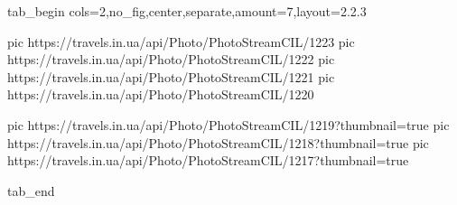  
 
 
 
 


\ifcmt
  tab_begin cols=2,no_fig,center,separate,amount=7,layout=2.2.3

     pic https://travels.in.ua/api/Photo/PhotoStreamCIL/1223
     pic https://travels.in.ua/api/Photo/PhotoStreamCIL/1222
		 pic https://travels.in.ua/api/Photo/PhotoStreamCIL/1221
		 pic https://travels.in.ua/api/Photo/PhotoStreamCIL/1220

		 pic https://travels.in.ua/api/Photo/PhotoStreamCIL/1219?thumbnail=true
		 pic https://travels.in.ua/api/Photo/PhotoStreamCIL/1218?thumbnail=true
		 pic https://travels.in.ua/api/Photo/PhotoStreamCIL/1217?thumbnail=true

  tab_end
\fi
